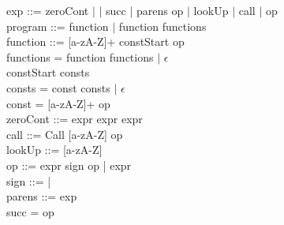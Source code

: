 exp ::= zeroCont $\mid$  $\mid$ succ $\mid$ parens op $\mid$ lookUp $\mid$ call $\mid$ op\\

program ::= function $\mid$ function functions\\

function ::= [a-zA-Z]+ \bnf{=>} constStart op\\

functions = \bnf{,} function functions $\mid$ $\epsilon$\\

constStart \bnf{[} consts \bnf{]}\\

consts = const \bnf{,} consts $\mid$ $\epsilon$\\

const = [a-zA-Z]+ \bnf{=} op\\

zeroCont ::=  \bnf{(} expr \bnf{)} \bnf{\{} expr \bnf{\}}  \bnf{\{} expr \bnf{\}}\\

call ::= Call [a-zA-Z] op\\

lookUp ::=  [a-zA-Z]\\

op ::= expr sign op | expr\\

sign ::= \bnf{+} | \bnf{*}\\

parens ::=\bnf{(} exp \bnf{)}\\

succ =  op\\
